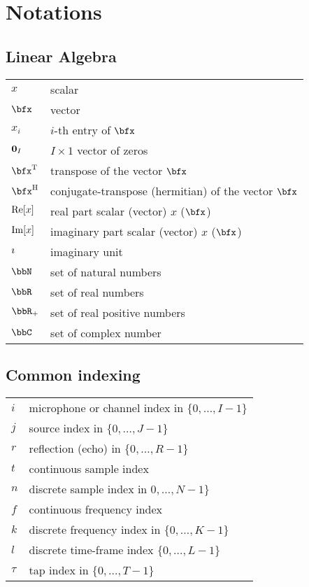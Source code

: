 \chapter*{Notations}


\section*{Linear Algebra}
\begin{table}[H]
    \begin{tabular}{ll}
        $x$     & scalar      \\
        $\bfx$  & vector      \\
        $x_i$   & $i$-th entry of $\bfx$ \\
        $\mathbf{0}_I$ & $I\times1$ vector of zeros\\
        $\ktranspose{\bfx}$   & transpose of the vector $\bfx$ \\
        $\khermitian{\bfx}$   & conjugate-transpose (hermitian) of the vector $\bfx$ \\
        $\operatorname{Re}[x]$ & real part scalar (vector) $x$ ($\bfx$) \\
        $\operatorname{Im}[x]$ & imaginary part scalar (vector) $x$ ($\bfx$) \\
        $\imath$  & imaginary unit \\
        $\bbN$    & set of natural numbers \\
        $\bbR$    & set of real numbers \\
        $\bbR_{+}$  & set of real positive numbers \\
        $\bbC$      & set of complex number \\
    \end{tabular}
\end{table}

\section*{Common indexing}
\begin{table}[H]
    \begin{tabular}{ll}
        $i$     & microphone or channel index in $\{0, \dots, I-1\}$      \\
        $j$     & source index in $\{0, \dots, J-1\}$      \\
        $r$     & reflection (echo) in $\{0, \dots, R-1\}$      \\
        $t$     & continuous sample index\\
        $n$     & discrete sample index in $0, \dots, N-1\}$ \\
        $f$     & continuous frequency index \\
        $k$     & discrete frequency index in $\{0, \dots, K-1\}$ \\
        $l$     & discrete time-frame index $\{0, \dots, L-1\}$\\
        $\tau$  & tap index in $\{0, \dots, T-1\}$\\
    \end{tabular}
\end{table}

